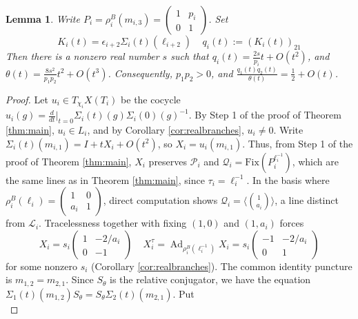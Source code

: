 \documentclass{article}
\newcommand{\Ad}{\operatorname{Ad}}
\theoremstyle{plain}
\theoremstyle{definition}
\theoremstyle{plain}
\theoremstyle{plain}
\theoremstyle{plain}
\newtheorem{lemma}[theorem]{Lemma}
\theoremstyle{remark}
\theoremstyle{remark}
\theoremstyle{plain}
\theoremstyle{plain}
\newcounter{main}
\theoremstyle{plain}
\theoremstyle{plain}
\begin{document}
\begin{lemma}\label{lma:residuehalf}
Write $P_i = \rho_i^B(m_{i,3}) = \left(\begin{smallmatrix}1&p_i\\0&1\end{smallmatrix}\right)$. Set
\begin{equation*}
	K_i(t) = \epsilon_{i+2}\Sigma_i(t)(\ell_{i+2}) \ \ \ \ \ q_i(t) := (K_i(t))_{21}
\end{equation*}
Then there is a nonzero real number $s$ such that $q_i(t) = \frac{2s}{p_i}t + O(t^2)$, and $\theta(t) = \frac{8s^2}{p_1p_2}t^2 + O(t^3)$. Consequently, $p_1p_2 > 0$, and $\frac{q_1(t)q_2(t)}{\theta(t)} = \frac12 + O(t)$. 
\end{lemma}

\begin{proof}
Let $u_i \in T_{\chi_i}X(T_i)$ be the cocycle $u_i(g) = \frac{d}{dt}|_{t=0}\Sigma_i(t)(g)\Sigma_i(0)(g)^{-1}$. By Step 1 of the proof of Theorem \ref{thm:main}, $u_i \in L_i$, and by Corollary \ref{cor:realbranches}, $u_i \neq 0$. Write $\Sigma_i(t)(m_{i, 1}) = I + tX_i + O(t^2)$, so $X_i = u_i(m_{i, 1})$. Thus, from Step 1 of the proof of Theorem \ref{thm:main}, $X_i$ preserves $\mathcal P_i$ and $\mathcal Q_i = \mathrm{Fix}(P_i^{\ell_i^{-1}})$, which are the same lines as in Theorem \ref{thm:main}, since $\tau_i = \ell_i^{-1}$. In the basis where $\rho_i^B(\ell_i) = \left(\begin{smallmatrix}1&0\\a_i&1\end{smallmatrix}\right)$, direct computation shows $\mathcal Q_i = \langle \binom{1}{a_i}\rangle$, a line distinct from $\mathcal L_i$. Tracelessness together with fixing $(1, 0)$ and $(1, a_i)$ forces
\begin{equation*}
	X_i = s_i\begin{pmatrix}1&-2/a_i\\0&-1\end{pmatrix} \ \ \ \ \ X_i^\tau = \Ad_{\rho_i^B(\ell_i^{-1})}X_i = s_i\begin{pmatrix}-1 & -2/a_i \\ 0 & 1\end{pmatrix}
\end{equation*}
for some nonzero $s_i$ (Corollary \ref{cor:realbranches}). The common identity puncture is $m_{1, 2} = m_{2, 1}$. Since $S_\theta$ is the relative conjugator, we have the equation $\Sigma_1(t)(m_{1,2})S_\theta = S_\theta\Sigma_2(t)(m_{2, 1})$. Put
\begin{equation*}

\end{equation*}
\end{proof}
\end{document}

